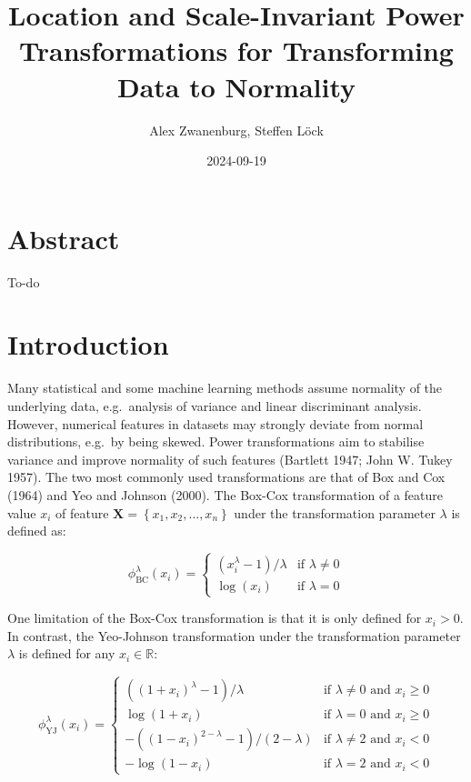 \documentclass[
  a4paper,
]{article}
\title{Location and Scale-Invariant Power Transformations for
Transforming Data to Normality}
\author{Alex Zwanenburg, Steffen Löck}
\date{2024-09-19}
\begin{document}
\maketitle

\section{Abstract}\label{abstract}

To-do

\section{Introduction}\label{introduction}

Many statistical and some machine learning methods assume normality of
the underlying data, e.g.~analysis of variance and linear discriminant
analysis. However, numerical features in datasets may strongly deviate
from normal distributions, e.g.~by being skewed. Power transformations
aim to stabilise variance and improve normality of such features
(Bartlett 1947; John W. Tukey 1957). The two most commonly used
transformations are that of Box and Cox (1964) and Yeo and Johnson
(2000). The Box-Cox transformation of a feature value \(x_i\) of feature
\(\mathbf{X}=\left\{x_1, x_2, \ldots, x_n \right\}\) under the
transformation parameter \(\lambda\) is defined as:

\begin{equation}
\label{eqn:box-cox-original}
\phi_{\text{BC}}^\lambda (x_i) = 
\begin{cases}
\left(x_i^\lambda - 1 \right) / \lambda & \text{if } \lambda \neq 0\\
\log(x_i) & \text{if } \lambda = 0
\end{cases}
\end{equation}

One limitation of the Box-Cox transformation is that it is only defined
for \(x_i > 0\). In contrast, the Yeo-Johnson transformation under the
transformation parameter \(\lambda\) is defined for any
\(x_i \in \mathbb{R}\):

\begin{equation}
\label{eqn:yeo-johnson-original}
\phi_{\text{YJ}}^\lambda (x_i) = 
\begin{cases}
\left( \left( 1 + x_i \right)^\lambda - 1\right) / \lambda & \text{if } \lambda \neq 0 \text{ and } x_i \geq 0\\
\log(1 + x_i) & \text{if } \lambda = 0 \text{ and } x_i \geq 0\\
-\left( \left( 1 - x_i\right)^{2 - \lambda} - 1 \right) / \left(2 - \lambda \right) & \text{if } \lambda \neq 2 \text{ and } x_i < 0\\
-\log(1 - x_i) & \text{if } \lambda = 2 \text{ and } x_i < 0
\end{cases}
\end{equation}
\end{document}
